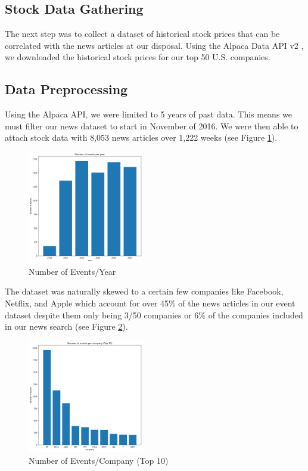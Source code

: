 \documentclass[conference]{IEEEtran}
\begin{document}
\subsection{Stock Data Gathering}
The next step was to collect a dataset of historical stock prices that can be correlated with the news articles at our disposal. Using the Alpaca Data API v2 \cite{alpacadataapi}, we downloaded the historical stock prices for our top 50 U.S. companies. 
\subsection{Data Preprocessing}
Using the Alpaca API, we were limited to 5 years of past data. This means we must filter our news dataset to start in November of 2016. We were then able to attach stock data with 8,053 news articles over 1,222 weeks (see Figure \ref{fig:eventsPerYear}).
\begin{figure}[h]
    \centering
    \includegraphics[width=0.45\textwidth]{eventsPerYear.png}
    \caption{Number of Events/Year}
    \label{fig:eventsPerYear}
\end{figure}

The dataset was naturally skewed to a certain few companies like Facebook, Netflix, and Apple which account for over 45\% of the news articles in our event dataset despite them only being 3/50 companies or 6\% of the companies included in our news search (see Figure \ref{fig:eventsPerCompany}). 

\begin{figure}[ht]
    \centering
    \includegraphics[width=0.45\textwidth]{eventsPerCompany.png}
    \caption{Number of Events/Company (Top 10)}
    \label{fig:eventsPerCompany}
\end{figure}
\end{document}
